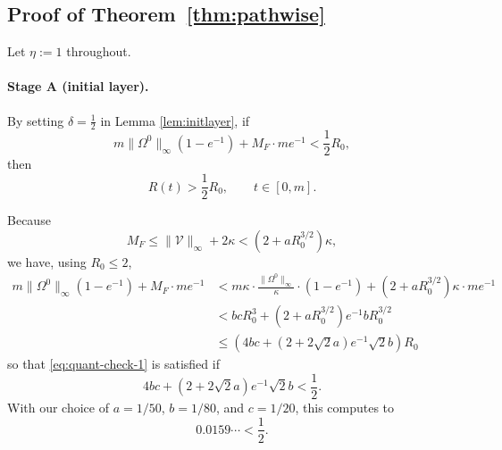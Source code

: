 \documentclass[11pt,reqno]{amsart}
\theoremstyle{definition}
\theoremstyle{remark}
\begin{document}
\subsection{Proof of Theorem~\ref{thm:pathwise}}\label{sec:pathwise-assembly}

Let $\eta:=1$ throughout.

\paragraph{Stage A (initial layer).}

By setting $\delta=\frac 12$ in  Lemma \ref{lem:initlayer}, if
\begin{equation}\label{eq:quant-check-1}
m\|\Omega^0\|_\infty(1-e^{-1})+M_F\cdot me^{-1}<\frac 12 R_0,
\end{equation}
then
\begin{equation}\label{eq:initial-layer}
R(t)>\frac 12 R_0,\qquad t\in [0,m].
\end{equation}

Because
\begin{equation}\label{eq:M_F-bound}
	M_F\le \|\mathcal{V}\|_\infty +2\kappa <(2+aR_0^{3/2})\kappa,
\end{equation}
we have, using $R_0\le 2$,
\begin{align*}
m\|\Omega^0\|_\infty(1-e^{-1})+M_F\cdot me^{-1}&<m\kappa \cdot \frac{\|\Omega^0\|_\infty}{\kappa}\cdot (1-e^{-1}) + (2+aR_0^{3/2})\kappa\cdot me^{-1}\\
&<bc R_0^3+(2+aR_0^{3/2})e^{-1}b R_0^{3/2}\\
&\le \left(4bc+(2+2\sqrt{2}a)e^{-1}\sqrt{2}b\right) R_0
\end{align*}
so that \eqref{eq:quant-check-1} is satisfied if
\begin{equation}\label{eq:quant-check-1-abc}
	4bc+(2+2\sqrt{2}a)e^{-1}\sqrt{2}b<\frac 12.
\end{equation}
With our choice of $a=1/50$, $b=1/80$, and $c=1/20$, this computes to
\[
0.0159\cdots<\frac 12.
\]
\end{document}
